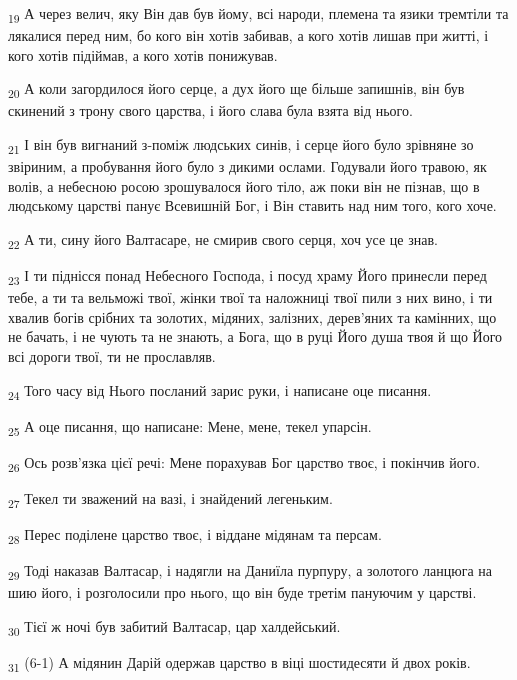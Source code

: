 \begin{tcolorbox}
\textsubscript{19} А через велич, яку Він дав був йому, всі народи, племена та язики тремтіли та лякалися перед ним, бо кого він хотів забивав, а кого хотів лишав при житті, і кого хотів підіймав, а кого хотів понижував.
\end{tcolorbox}
\begin{tcolorbox}
\textsubscript{20} А коли загордилося його серце, а дух його ще більше запишнів, він був скинений з трону свого царства, і його слава була взята від нього.
\end{tcolorbox}
\begin{tcolorbox}
\textsubscript{21} І він був вигнаний з-поміж людських синів, і серце його було зрівняне зо звіриним, а пробування його було з дикими ослами. Годували його травою, як волів, а небесною росою зрошувалося його тіло, аж поки він не пізнав, що в людському царстві панує Всевишній Бог, і Він ставить над ним того, кого хоче.
\end{tcolorbox}
\begin{tcolorbox}
\textsubscript{22} А ти, сину його Валтасаре, не смирив свого серця, хоч усе це знав.
\end{tcolorbox}
\begin{tcolorbox}
\textsubscript{23} І ти піднісся понад Небесного Господа, і посуд храму Його принесли перед тебе, а ти та вельможі твої, жінки твої та наложниці твої пили з них вино, і ти хвалив богів срібних та золотих, мідяних, залізних, дерев'яних та камінних, що не бачать, і не чують та не знають, а Бога, що в руці Його душа твоя й що Його всі дороги твої, ти не прославляв.
\end{tcolorbox}
\begin{tcolorbox}
\textsubscript{24} Того часу від Нього посланий зарис руки, і написане оце писання.
\end{tcolorbox}
\begin{tcolorbox}
\textsubscript{25} А оце писання, що написане: Мене, мене, текел упарсін.
\end{tcolorbox}
\begin{tcolorbox}
\textsubscript{26} Ось розв'язка цієї речі: Мене порахував Бог царство твоє, і покінчив його.
\end{tcolorbox}
\begin{tcolorbox}
\textsubscript{27} Текел ти зважений на вазі, і знайдений легеньким.
\end{tcolorbox}
\begin{tcolorbox}
\textsubscript{28} Перес поділене царство твоє, і віддане мідянам та персам.
\end{tcolorbox}
\begin{tcolorbox}
\textsubscript{29} Тоді наказав Валтасар, і надягли на Даниїла пурпуру, а золотого ланцюга на шию його, і розголосили про нього, що він буде третім пануючим у царстві.
\end{tcolorbox}
\begin{tcolorbox}
\textsubscript{30} Тієї ж ночі був забитий Валтасар, цар халдейський.
\end{tcolorbox}
\begin{tcolorbox}
\textsubscript{31} (6-1) А мідянин Дарій одержав царство в віці шостидесяти й двох років.
\end{tcolorbox}
